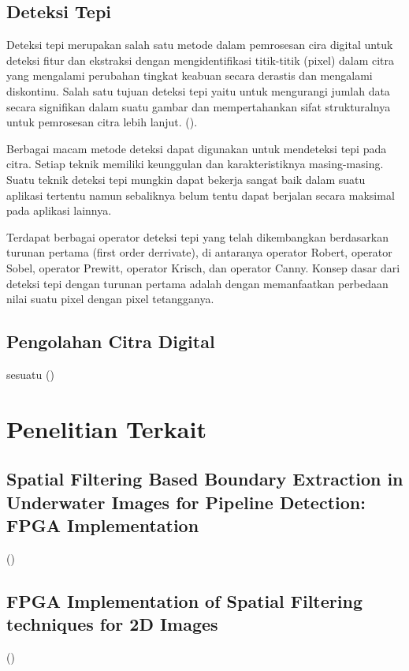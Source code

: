 \subsection{Deteksi Tepi}
Deteksi tepi merupakan salah satu metode dalam pemrosesan cira digital untuk deteksi fitur dan ekstraksi dengan mengidentifikasi titik-titik (pixel) dalam citra yang mengalami perubahan tingkat keabuan secara derastis dan mengalami diskontinu. Salah satu tujuan deteksi tepi yaitu untuk mengurangi jumlah data secara signifikan dalam suatu gambar dan mempertahankan sifat strukturalnya untuk pemrosesan citra lebih lanjut. (\cite{desi_herawati}).

Berbagai macam metode deteksi dapat digunakan untuk mendeteksi tepi pada citra. Setiap teknik memiliki keunggulan dan karakteristiknya masing-masing. Suatu teknik deteksi tepi mungkin dapat bekerja sangat baik dalam suatu aplikasi tertentu namun sebaliknya belum tentu dapat berjalan secara maksimal pada aplikasi lainnya.

Terdapat berbagai operator deteksi tepi yang telah dikembangkan berdasarkan turunan pertama (first order derrivate), di antaranya operator Robert, operator Sobel, operator Prewitt, operator Krisch, dan operator Canny. Konsep dasar dari deteksi tepi dengan turunan pertama adalah dengan memanfaatkan perbedaan nilai suatu pixel dengan pixel tetangganya. 

\subsection{Pengolahan Citra Digital}
sesuatu (\cite{book:gonzalez})

\section{Penelitian Terkait}
\subsection{Spatial Filtering Based Boundary Extraction in Underwater Images for Pipeline Detection: FPGA Implementation}
\blindtext (\cite{soa:alex-raj})

\subsection{FPGA Implementation of Spatial Filtering techniques for 2D Images}
\blindtext (\cite{soa:sushant})

